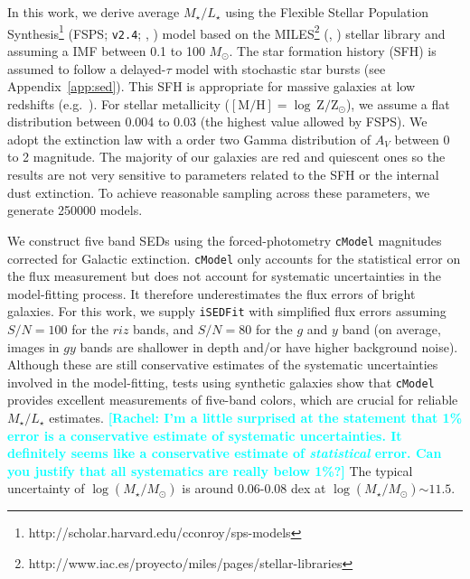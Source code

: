 \documentclass[a4paper,fleqn,usenatbib]{mnras}
\def\msun{$M_\odot$}
\def\cmodel{\texttt{cModel}}
\def\logms{{$\log (M_{\star}/M_{\odot})$}}
\def\m2l{{$M_{\star}/L_{\star}$}}
\newcommand{\rachel}[1]{\textcolor{cyan}{\textbf{[Rachel: #1]}}}
\begin{document}
    In this work, we derive average \m2l{} using the Flexible Stellar Population 
    Synthesis\footnote{http://scholar.harvard.edu/cconroy/sps-models}
    (FSPS; \texttt{v2.4}; \citealt{FSPS}, \citealt{Conroy2010}) model based on the 
    MILES\footnote{http://www.iac.es/proyecto/miles/pages/stellar-libraries}
    (\citealt{MILES1}, \citealt{MILES2}) stellar library and assuming a
    \citet{Chabrier2003} IMF between 0.1 to 100 \msun. 
    The star formation history (SFH) is assumed to follow a delayed-$\tau$ model with 
    stochastic star bursts (see Appendix~\ref{app:sed}). 
    This SFH is appropriate for massive galaxies at low redshifts 
    (e.g.\ \citealt{Kauffmann2003}). 
    For stellar metallicity 
    ($[\mathrm{M}/\mathrm{H}]=\log\ \mathrm{Z}/\mathrm{Z}_{\odot}$), we assume a flat 
    distribution between 0.004 to 0.03 (the highest value allowed by FSPS).
    We adopt the \citet{Calzetti2000} extinction law with a order two Gamma 
    distribution of $A_{V}$ between 0 to 2 magnitude. 
    The majority of our galaxies are red and quiescent ones so the results are not 
    very sensitive to parameters related to the SFH or the internal dust extinction. 
    To achieve reasonable sampling across these parameters, we generate 250000 models. 
    
    We construct five band SEDs using the forced-photometry \cmodel{} magnitudes 
    corrected for Galactic extinction. 
    \cmodel{} only accounts for the statistical error on the flux measurement but 
    does not account for systematic uncertainties in the model-fitting process. 
    It therefore underestimates the flux errors of bright galaxies. 
    For this work, we supply \texttt{iSEDFit} with simplified flux errors assuming 
    $S/N = 100$ for the $riz$ bands, and $S/N = 80$ for the $g$ and $y$ band 
    (on average, images in $gy$ bands are shallower in depth and/or have higher 
    background noise).  
    Although these are still conservative estimates of the systematic uncertainties 
    involved in the model-fitting, tests using synthetic galaxies show that \cmodel{}
    provides excellent measurements of five-band colors, which are crucial for 
    reliable \m2l{} estimates.
\rachel{I'm a little surprised at the statement that 1\% error is a conservative estimate of systematic uncertainties.  It definitely seems like a conservative estimate of {\em statistical} error.  Can you justify that all systematics are really below 1\%?}
The typical uncertainty of \logms{} is around 0.06-0.08 dex at \logms${\sim} 11.5$.
    
\end{document}
